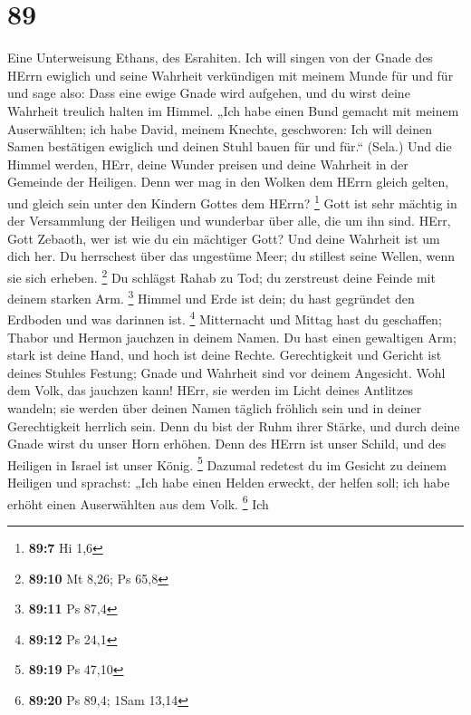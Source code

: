 \hypertarget{section-28}{%
\section{89}\label{section-28}}

 Eine Unterweisung Ethans, des Esrahiten.  Ich
will singen von der Gnade des HErrn ewiglich und seine Wahrheit
verkündigen mit meinem Munde für und für  und sage also:
Dass eine ewige Gnade wird aufgehen, und du wirst deine Wahrheit
treulich halten im Himmel.  „Ich habe einen Bund gemacht mit
meinem Auserwählten; ich habe David, meinem Knechte, geschworen:
 Ich will deinen Samen bestätigen ewiglich und deinen Stuhl
bauen für und für.`` (Sela.)  Und die Himmel werden, HErr,
deine Wunder preisen und deine Wahrheit in der Gemeinde der Heiligen.
 Denn wer mag in den Wolken dem HErrn gleich gelten, und
gleich sein unter den Kindern Gottes dem HErrn? \footnote{\textbf{89:7}
  Hi 1,6}  Gott ist sehr mächtig in der Versammlung der
Heiligen und wunderbar über alle, die um ihn sind.  HErr,
Gott Zebaoth, wer ist wie du ein mächtiger Gott? Und deine Wahrheit ist
um dich her.  Du herrschest über das ungestüme Meer; du
stillest seine Wellen, wenn sie sich erheben. \footnote{\textbf{89:10}
  Mt 8,26; Ps 65,8}  Du schlägst Rahab zu Tod; du
zerstreust deine Feinde mit deinem starken Arm. \footnote{\textbf{89:11}
  Ps 87,4}  Himmel und Erde ist dein; du hast gegründet den
Erdboden und was darinnen ist. \footnote{\textbf{89:12} Ps 24,1}
 Mitternacht und Mittag hast du geschaffen; Thabor und
Hermon jauchzen in deinem Namen.  Du hast einen gewaltigen
Arm; stark ist deine Hand, und hoch ist deine Rechte. 
Gerechtigkeit und Gericht ist deines Stuhles Festung; Gnade und Wahrheit
sind vor deinem Angesicht.  Wohl dem Volk, das jauchzen
kann! HErr, sie werden im Licht deines Antlitzes wandeln; 
sie werden über deinen Namen täglich fröhlich sein und in deiner
Gerechtigkeit herrlich sein.  Denn du bist der Ruhm ihrer
Stärke, und durch deine Gnade wirst du unser Horn erhöhen. 
Denn des HErrn ist unser Schild, und des Heiligen in Israel ist unser
König. \footnote{\textbf{89:19} Ps 47,10}  Dazumal redetest
du im Gesicht zu deinem Heiligen und sprachst: „Ich habe einen Helden
erweckt, der helfen soll; ich habe erhöht einen Auserwählten aus dem
Volk. \footnote{\textbf{89:20} Ps 89,4; 1Sam 13,14}  Ich
